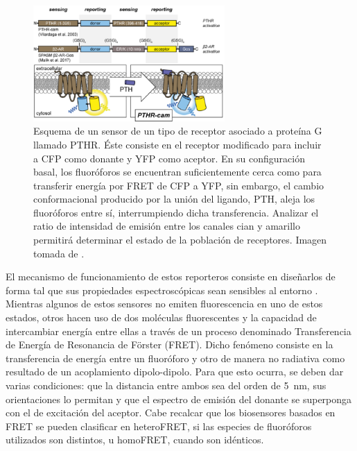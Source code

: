 \begin{figure}
    \centering
    \includegraphics[width=0.65\textwidth]{img/cap_1/pthr.pdf}
    \caption{\footnotesize{Esquema de un sensor de un tipo de receptor asociado a proteína G llamado PTHR. Éste consiste en el receptor modificado para incluir a CFP como donante y YFP como aceptor. En su configuración basal, los fluoróforos se encuentran suficientemente cerca como para transferir energía por FRET de CFP a YFP, sin embargo, el cambio conformacional producido por la unión del ligando, PTH, aleja los fluoróforos entre sí, interrumpiendo dicha transferencia. Analizar el ratio de intensidad de emisión entre los canales cian y amarillo permitirá determinar el estado de la población de receptores. Imagen tomada de \cite{Greenwald2018}.}}
    \label{fig:pthr}
\end{figure}

El mecanismo de funcionamiento de estos reporteros consiste en diseñarlos de forma tal que sus propiedades espectroscópicas sean sensibles al entorno \citep{Bastiaens1999}. Mientras algunos de estos sensores no emiten fluorescencia en uno de estos estados, otros hacen uso de dos moléculas fluorescentes y la capacidad de intercambiar energía entre ellas a través de un proceso denominado Transferencia de Energía de Resonancia de Förster (FRET). Dicho fenómeno consiste en la transferencia de energía entre un fluoróforo y otro de manera no radiativa como resultado de un acoplamiento dipolo-dipolo. Para que esto ocurra, se deben dar varias condiciones: que la distancia entre ambos sea del orden de 5~nm, sus orientaciones lo permitan y que el espectro de emisión del donante se superponga con el de excitación del aceptor. Cabe recalcar que los biosensores basados en FRET se pueden clasificar en heteroFRET, si las especies de fluoróforos utilizados son distintos, u homoFRET, cuando son idénticos.

